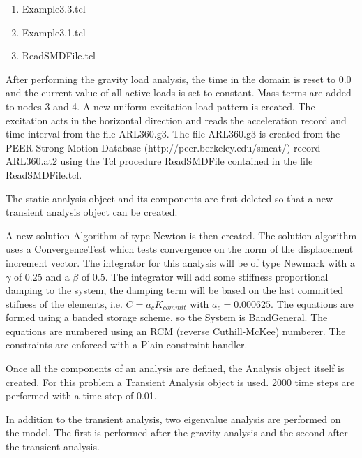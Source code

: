 \documentclass[12pt]{article}
\begin{document}
\vspace{0.2in}  
\begin{enumerate} 
\item Example3.3.tcl
\item Example3.1.tcl
\item ReadSMDFile.tcl
\end{enumerate}

\vspace{0.2in} 

After performing the gravity load analysis, the time in
the domain is reset to 0.0 and the current value of all active loads
is set to constant. Mass terms are added to nodes 3 and 4. A new uniform
excitation load pattern is created. The excitation acts in the
horizontal direction and reads the acceleration record and time
interval from the file ARL360.g3. The file ARL360.g3 is created from
the PEER Strong Motion Database (http://peer.berkeley.edu/smcat/)
record ARL360.at2 using the Tcl procedure ReadSMDFile contained in the
file ReadSMDFile.tcl.   


\vspace{0.2in}

The static analysis object and its components are first deleted so
that a new transient analysis object can be created.

A new solution Algorithm of type Newton is then created. The solution
algorithm uses a ConvergenceTest which tests convergence on the norm
of the displacement increment vector. The integrator for this analysis
will be of type Newmark with a $\gamma$ of 0.25 and a $\beta$ of
0.5. The integrator will add some stiffness proportional damping to
the system, the damping term will be based on the last committed
stifness of the elements, i.e. $C = a_c K_{commit}$ with $a_c = 0.000625$.
The equations are formed using a banded storage scheme, so the System
is BandGeneral. The equations are numbered using an RCM (reverse
Cuthill-McKee) numberer. The constraints are enforced with a
Plain constraint handler.  

Once all the components of an analysis are defined, the Analysis
object itself is created.  For this problem a Transient Analysis object
is used. 2000 time steps are performed with a time step of 0.01.

In addition to the transient analysis, two eigenvalue analysis are
performed on the model. The first is performed after the gravity
analysis and the second after the transient analysis.
\end{document}
